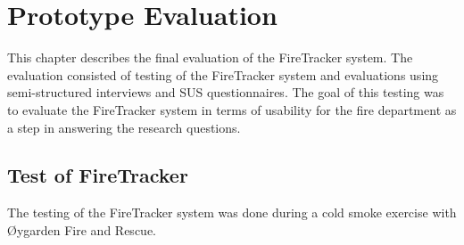 \documentclass[../Main/thesis.tex]{subfiles}
\begin{document}
\chapter{Prototype Evaluation}
\label{ch:evaluation}
This chapter describes the final evaluation of the FireTracker system.
The evaluation consisted of testing of the FireTracker system and evaluations using semi-structured interviews and SUS questionnaires.
The goal of this testing was to evaluate the FireTracker system in terms of usability for the fire department as a step in answering the research questions.

%

\section{Test of FireTracker}
The testing of the FireTracker system was done during a cold smoke exercise with Øygarden Fire and Rescue.
\end{document}
